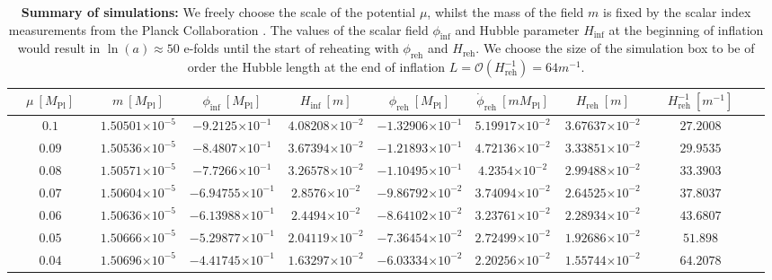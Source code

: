 \documentclass[
    reprint,
    preprintnumbers,
    superscriptaddress,
    nofootinbib,
     amsmath,amssymb,
     aps,
     prd,
    floatfix,
    ]{revtex4-2}
\newcommand{\mpl}{M_\mathrm{Pl}}
\newcommand{\reh}{_\mathrm{reh}}
\newcommand{\ee}[1]{{\times 10^{#1}}}
\begin{document}
\begin{table*}[t!]
\centering
\begin{tabular}{|c|c|c|c|c|c|c|c|c|}
\hline
$\quad\mu~[\mpl]\quad$ & $\quad m~[\mpl]\quad$   & $\phi_\mathrm{inf}~[\mpl]$             &  $\quad H_\mathrm{inf}~[m]\quad$ & $\phi\reh~[\mpl]$ &  $\dot{\phi}\reh~[m \mpl]$ & $\quad H\reh~[m]\quad$ & $\quad H^{-1}\reh~[m^{-1}]\quad$  \\ \hline

$0.1$ & $1.50501\ee{-5}$ & $-9.2125\ee{-1}$ & $4.08208\ee{-2}$ & $-1.32906\ee{-1}$ & $5.19917\ee{-2}$ & $3.67637\ee{-2}$ & $27.2008$ \\ \hline

$0.09$ & $1.50536\ee{-5}$ & $-8.4807\ee{-1}$ & $3.67394\ee{-2}$ & $-1.21893\ee{-1}$ & $4.72136\ee{-2}$ & $3.33851\ee{-2}$ & $29.9535$ \\ \hline

$0.08$ & $1.50571\ee{-5}$ & $-7.7266\ee{-1}$ & $3.26578\ee{-2}$ & $-1.10495\ee{-1}$ & $4.2354\ee{-2}$ & $2.99488\ee{-2}$ & $33.3903$ \\ \hline

$0.07$ & $1.50604\ee{-5}$ & $-6.94755\ee{-1}$ & $2.8576\ee{-2}$ & $-9.86792\ee{-2}$ & $3.74094\ee{-2}$ & $2.64525\ee{-2}$ & $37.8037$ \\ \hline

$0.06$ & $1.50636\ee{-5}$ & $-6.13988\ee{-1}$ & $2.4494\ee{-2}$ & $-8.64102\ee{-2}$ & $3.23761\ee{-2}$ & $2.28934\ee{-2}$ & $43.6807$\\ \hline

$0.05$ & $1.50666\ee{-5}$ & $-5.29877\ee{-1}$ & $2.04119\ee{-2}$ & $-7.36454\ee{-2}$ & $2.72499\ee{-2}$ & $1.92686\ee{-2}$ & $51.898$ \\ \hline

$0.04$ & $1.50696\ee{-5}$ & $-4.41745\ee{-1}$ & $1.63297\ee{-2}$ & $-6.03334\ee{-2}$ & $2.20256\ee{-2}$ & $1.55744\ee{-2}$ & $64.2078$ \\ \hline
\end{tabular}
 \caption{\textbf{Summary of simulations:} We freely choose the scale of the potential $\mu$, whilst the mass of the field $m$ is fixed by the scalar index measurements from the Planck Collaboration \cite{Planck:2018jri}. The values of the scalar field $\phi_\mathrm{inf}$ and Hubble parameter $H_\mathrm{inf}$ at the beginning of inflation would result in $\ln(a)\approx 50$ e-folds until the start of reheating with $\phi_\mathrm{reh}$ and $H_\mathrm{reh}$. We choose the size of the simulation box to be of order the Hubble length at the end of inflation $L=\mathcal{O}(H\reh^{-1})=64m^{-1}$.}
\label{fig:table}
\end{table*}
\end{document}
